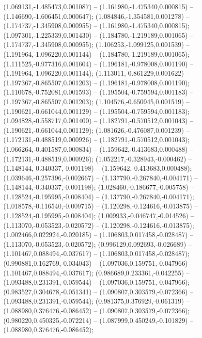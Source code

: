  (1.069131,-1.485473,0.001087) -- (1.161980,-1.475340,0.000815) -- (1.146690,-1.606451,0.000647);
 (1.084846,-1.354581,0.001278) -- (1.174737,-1.345908,0.000955) -- (1.161980,-1.475340,0.000815);
 (1.097301,-1.225339,0.001430) -- (1.184780,-1.219189,0.001065) -- (1.174737,-1.345908,0.000955);
 (1.106253,-1.099125,0.001539) -- (1.191964,-1.096220,0.001144) -- (1.184780,-1.219189,0.001065);
 (1.111525,-0.977316,0.001604) -- (1.196181,-0.978008,0.001190) -- (1.191964,-1.096220,0.001144);
 (1.113011,-0.861229,0.001622) -- (1.197367,-0.865507,0.001203) -- (1.196181,-0.978008,0.001190);
 (1.110678,-0.752081,0.001593) -- (1.195504,-0.759594,0.001183) -- (1.197367,-0.865507,0.001203);
 (1.104576,-0.650945,0.001519) -- (1.190621,-0.661044,0.001129) -- (1.195504,-0.759594,0.001183);
 (1.094828,-0.558717,0.001400) -- (1.182791,-0.570512,0.001043) -- (1.190621,-0.661044,0.001129);
 (1.081626,-0.476087,0.001239) -- (1.172131,-0.488519,0.000926) -- (1.182791,-0.570512,0.001043);
 (1.066264,-0.401587,0.000834) -- (1.159642,-0.413683,0.000488) -- (1.172131,-0.488519,0.000926);
 (1.052217,-0.328943,-0.000462) -- (1.148144,-0.340337,-0.001198) -- (1.159642,-0.413683,0.000488);
 (1.039646,-0.257396,-0.002667) -- (1.137790,-0.267840,-0.004171) -- (1.148144,-0.340337,-0.001198);
 (1.028460,-0.186677,-0.005758) -- (1.128524,-0.195995,-0.008404) -- (1.137790,-0.267840,-0.004171);
 (1.018578,-0.116540,-0.009715) -- (1.120298,-0.124616,-0.013875) -- (1.128524,-0.195995,-0.008404);
 (1.009933,-0.046747,-0.014526) -- (1.113070,-0.053523,-0.020572) -- (1.120298,-0.124616,-0.013875);
 (1.002466,0.022924,-0.020185) -- (1.106803,0.017458,-0.028487) -- (1.113070,-0.053523,-0.020572);
 (0.996129,0.092693,-0.026689) -- (1.101467,0.088494,-0.037617) -- (1.106803,0.017458,-0.028487);
 (0.990881,0.162769,-0.034043) -- (1.097036,0.159751,-0.047966) -- (1.101467,0.088494,-0.037617);
 (0.986689,0.233361,-0.042255) -- (1.093488,0.231391,-0.059544) -- (1.097036,0.159751,-0.047966);
 (0.983527,0.304678,-0.051341) -- (1.090807,0.303579,-0.072366) -- (1.093488,0.231391,-0.059544);
 (0.981375,0.376929,-0.061319) -- (1.088980,0.376476,-0.086452) -- (1.090807,0.303579,-0.072366);
 (0.980220,0.450325,-0.072214) -- (1.087999,0.450249,-0.101829) -- (1.088980,0.376476,-0.086452);

